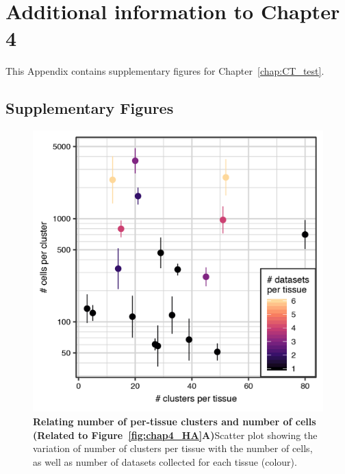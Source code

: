 
\chapter{Additional information to Chapter 4} \label{appendix:CTsub}
This Appendix contains supplementary figures for Chapter~\ref{chap:CT_test}.


\section{Supplementary Figures}
\label{sectionC1.1}

\begin{figure}[ht!] 
\centering    
\includegraphics[scale=1.25]{Appendix3/Figs/tissue_cluster_dataset_numbers_HumanAtlas.png} %
\caption[Relating number of per-tissue clusters and number of cells]{\textbf{Relating number of per-tissue clusters and number of cells (Related to Figure~\ref{fig:chap4_HA}A)}\newline Scatter plot showing the variation of number of clusters per tissue with the number of cells, as well as number of datasets collected for each tissue (colour).}
\label{fig:appB_clustnumbs}
\end{figure}



